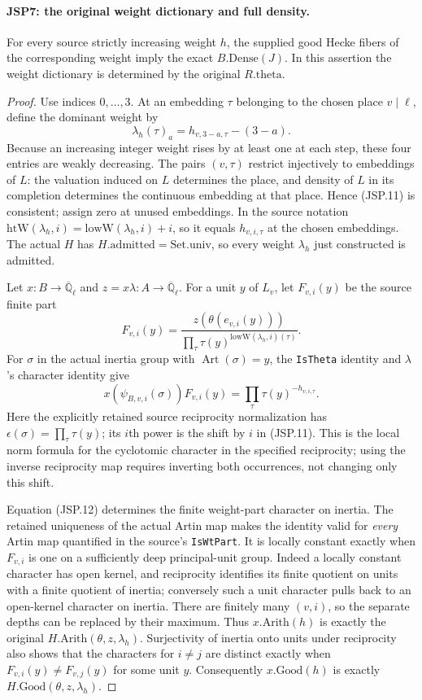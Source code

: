 \paragraph{JSP7: the original weight dictionary and full density.}
\label{claim:JSP7}
For every source strictly increasing weight $h$, the supplied
good Hecke fibers of the corresponding weight imply the exact
$B.\mathrm{Dense}(J)$. In this assertion the weight dictionary
is determined by the original $R.\mathrm{theta}$.
\begin{proof}
Use indices $0,\ldots,3$. At an embedding $\tau$ belonging to
the chosen place $v\mid\ell$, define the dominant weight by
\[
 \lambda_h(\tau)_a=h_{v,3-a,\tau}-(3-a).
 \tag{JSP.11}
\]
Because an increasing integer weight rises by at least one at
each step, these four entries are weakly decreasing.
The pairs $(v,\tau)$ restrict injectively to embeddings of
$L$: the valuation induced on $L$ determines the place, and
density of $L$ in its completion determines the continuous
embedding at that place. Hence (JSP.11) is consistent; assign
zero at unused embeddings. In the source notation
$\mathrm{htW}(\lambda_h,i)=\mathrm{lowW}(\lambda_h,i)+i$,
so it equals $h_{v,i,\tau}$ at the chosen embeddings.
The actual $H$ has $H.\mathrm{admitted}=\mathrm{Set.univ}$,
so every weight $\lambda_h$ just constructed is admitted.

Let $x:B\to\overline{\mathbb Q}_\ell$ and
$z=x\lambda:A\to\overline{\mathbb Q}_\ell$.
For a unit $y$ of $L_v$, let $F_{v,i}(y)$ be the source finite
part
\[
 F_{v,i}(y)=
 \frac{z(\theta(e_{v,i}(y)))}
      {\prod_\tau\tau(y)^{\mathrm{lowW}(\lambda_h,i)(\tau)}}.
\]
For $\sigma$ in the actual inertia group with
$\operatorname{Art}(\sigma)=y$, the \texttt{IsTheta}
identity and $\lambda$'s character identity give
\[
 x(\psi_{B,v,i}(\sigma))F_{v,i}(y)
                  =\prod_\tau\tau(y)^{-h_{v,i,\tau}}. \tag{JSP.12}
\]
Here the explicitly retained source reciprocity normalization has
$\epsilon(\sigma)=\prod_\tau\tau(y)$; its $i$th power
is the shift by $i$ in (JSP.11). This is the local norm formula
for the cyclotomic character in the specified reciprocity;
using the inverse reciprocity map requires inverting both
occurrences, not changing only this shift.

Equation (JSP.12) determines the finite weight-part character
on inertia. The retained uniqueness of the actual Artin map
makes the identity valid for \emph{every} Artin map quantified
in the source's \texttt{IsWtPart}. It is locally constant
exactly when $F_{v,i}$ is
one on a sufficiently deep principal-unit group. Indeed a
locally constant character has open kernel, and reciprocity
identifies its finite quotient on units with a finite quotient
of inertia; conversely such a unit character pulls back to
an open-kernel character on inertia. There are finitely many
$(v,i)$, so the separate depths can be replaced by their maximum.
Thus $x.\mathrm{Arith}(h)$ is exactly the original
$H.\mathrm{Arith}(\theta,z,\lambda_h)$.
Surjectivity of inertia onto units under reciprocity also shows
that the characters for $i\ne j$ are distinct exactly when
$F_{v,i}(y)\ne F_{v,j}(y)$ for some unit $y$.
Consequently $x.\mathrm{Good}(h)$ is exactly
$H.\mathrm{Good}(\theta,z,\lambda_h)$.


\end{proof}
